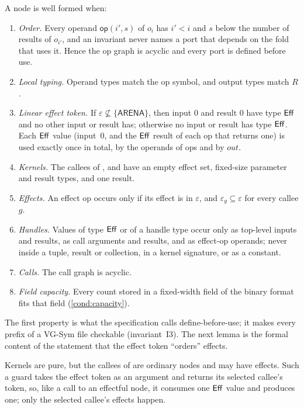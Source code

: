 \begin{definition}\label{def:wf}
A node is well formed when:
\begin{enumerate}[label=(W\arabic*),ref=W\arabic*]
\item\label{wf:order} \emph{Order.} Every operand $\mathsf{op}(i',s)$ of $o_i$ has $i'<i$ and
  $s$ below the number of results of $o_{i'}$, and an invariant never names a port that
  depends on the fold that uses it. Hence the op graph is acyclic and every port is defined
  before use.
\item\label{wf:typing} \emph{Local typing.} Operand types match the op symbol, and output
  types match $R$.
\item\label{wf:eff} \emph{Linear effect token.} If $\varepsilon\not\subseteq\{\textsf{ARENA}\}$,
  then input $0$ and result $0$ have type $\mathsf{Eff}$ and no other input or result has; otherwise no
  input or result has type $\mathsf{Eff}$. Each $\mathsf{Eff}$ value (input~$0$, and the $\mathsf{Eff}$ result of each
  op that returns one) is used exactly once in total, by the operands of ops and by
  $\mathit{out}$.
\item\label{wf:kernel} \emph{Kernels.} The callees of ,  and
   have an empty effect set, fixed-size parameter and result types, and one
  result.
\item\label{wf:effects} \emph{Effects.} An effect op occurs only if its effect is in
  $\varepsilon$, and $\varepsilon_g\subseteq\varepsilon$ for every callee $g$.
\item\label{wf:handles} \emph{Handles.} Values of type $\mathsf{Eff}$ or of a handle type occur only as
  top-level inputs and results, as call arguments and results, and as effect-op operands; never
  inside a tuple, result or collection, in a kernel signature, or as a constant.
\item\label{wf:calls} \emph{Calls.} The call graph is acyclic.
\item\label{wf:capacity} \emph{Field capacity.} Every count stored in a fixed-width field of
  the binary format fits that field (\cref{cond:capacity}).
\end{enumerate}
\end{definition}

The first property is what the specification calls define-before-use; it makes every prefix
of a VG-Sym file checkable (invariant~I3). The next lemma is the formal content of the
statement that the effect token ``orders'' effects.

Kernels are pure, but the callees of  are ordinary nodes and may have
effects. Such a guard takes the effect token as an argument and returns its selected callee's
token, so, like a call to an effectful node, it consumes one $\mathsf{Eff}$ value and produces one; only
the selected callee's effects happen.

